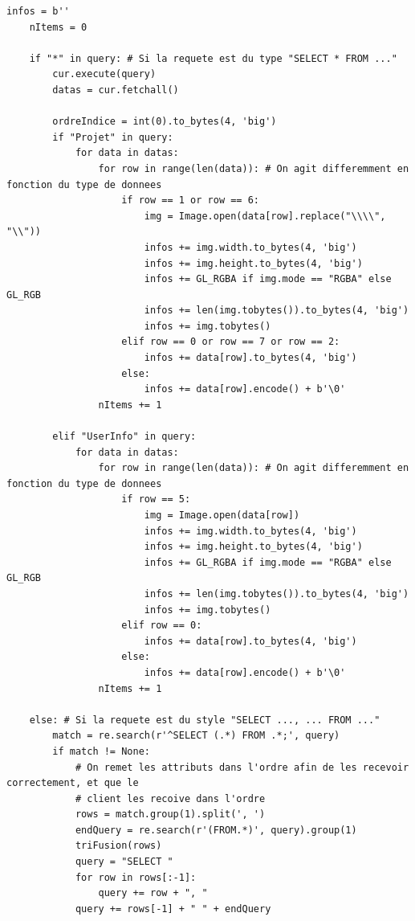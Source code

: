 \documentclass[twoside]{report}
\begin{document}
\begin{appendix}
\begin{lstlisting}[style=py, caption=serveur.py : SQL, label=sql]
    infos = b''
    nItems = 0

    if "*" in query: # Si la requete est du type "SELECT * FROM ..."
        cur.execute(query)
        datas = cur.fetchall()

        ordreIndice = int(0).to_bytes(4, 'big')
        if "Projet" in query:
            for data in datas:
                for row in range(len(data)): # On agit differemment en fonction du type de donnees
                    if row == 1 or row == 6:
                        img = Image.open(data[row].replace("\\\\", "\\"))
                        infos += img.width.to_bytes(4, 'big')
                        infos += img.height.to_bytes(4, 'big')
                        infos += GL_RGBA if img.mode == "RGBA" else GL_RGB
                        infos += len(img.tobytes()).to_bytes(4, 'big')
                        infos += img.tobytes()
                    elif row == 0 or row == 7 or row == 2:
                        infos += data[row].to_bytes(4, 'big')
                    else:
                        infos += data[row].encode() + b'\0'
                nItems += 1

        elif "UserInfo" in query:
            for data in datas:
                for row in range(len(data)): # On agit differemment en fonction du type de donnees
                    if row == 5:
                        img = Image.open(data[row])
                        infos += img.width.to_bytes(4, 'big')
                        infos += img.height.to_bytes(4, 'big')
                        infos += GL_RGBA if img.mode == "RGBA" else GL_RGB
                        infos += len(img.tobytes()).to_bytes(4, 'big')
                        infos += img.tobytes()
                    elif row == 0:
                        infos += data[row].to_bytes(4, 'big')
                    else:
                        infos += data[row].encode() + b'\0'
                nItems += 1
    
    else: # Si la requete est du style "SELECT ..., ... FROM ..."
        match = re.search(r'^SELECT (.*) FROM .*;', query)
        if match != None:
            # On remet les attributs dans l'ordre afin de les recevoir correctement, et que le
            # client les recoive dans l'ordre
            rows = match.group(1).split(', ')
            endQuery = re.search(r'(FROM.*)', query).group(1)
            triFusion(rows)
            query = "SELECT "
            for row in rows[:-1]:
                query += row + ", "
            query += rows[-1] + " " + endQuery


\end{lstlisting}
\end{appendix}
\end{document}
